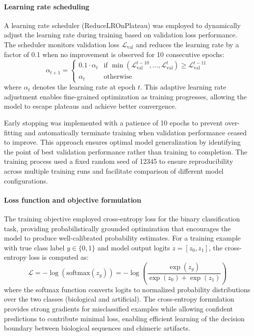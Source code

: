 \documentclass[pdflatex,sn-nature]{sn-jnl}%
\theoremstyle{thmstyleone}%
\theoremstyle{thmstyletwo}%
\theoremstyle{thmstylethree}%
\begin{document}
\paragraph{Learning rate scheduling}
A learning rate scheduler (ReduceLROnPlateau) was employed to dynamically adjust the learning rate during training based on validation loss performance.
The scheduler monitors validation loss $\mathcal{L}_{\text{val}}$ and reduces the learning rate by a factor of 0.1 when no improvement is observed for 10 consecutive epochs:
$$
	\alpha_{t+1} = \begin{cases}
		0.1 \cdot \alpha_t & \text{if } \min(\mathcal{L}_{\text{val}}^{t-10}, \ldots, \mathcal{L}_{\text{val}}^{t}) \geq \mathcal{L}_{\text{val}}^{t-11} \\
		\alpha_t           & \text{otherwise}
	\end{cases}
$$
where $\alpha_t$ denotes the learning rate at epoch $t$.
This adaptive learning rate adjustment enables fine-grained optimization as training progresses, allowing the model to escape plateaus and achieve better convergence.

Early stopping was implemented with a patience of 10 epochs to prevent over-fitting and automatically terminate training when validation performance ceased to improve.
This approach ensures optimal model generalization by identifying the point of best validation performance rather than training to completion.
The training process used a fixed random seed of 12345 to ensure reproducibility across multiple training runs and facilitate comparison of different model configurations.

\paragraph{Loss function and objective formulation}
The training objective employed cross-entropy loss for the binary classification task, providing probabilistically grounded optimization that encourages the model to produce well-calibrated probability estimates.
For a training example with true class label $y \in \{0,1\}$ and model output logits $z = [z_0, z_1]$, the cross-entropy loss is computed as:
$$
	\mathcal{L} = -\log(\textrm{softmax}(z_y)) = -\log\left(\frac{\exp(z_y)}{\exp(z_0) + \exp(z_1)}\right)
$$
where the softmax function converts logits to normalized probability distributions over the two classes (biological and artificial).
The cross-entropy formulation provides strong gradients for misclassified examples while allowing confident predictions to contribute minimal loss, enabling efficient learning of the decision boundary between biological sequences and chimeric artifacts.
\end{document}
